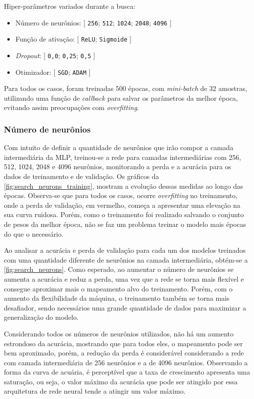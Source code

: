 Hiper-parâmetros variados durante a busca:


\begin{itemize}
	\item Número de neurônios: [ \texttt{256}; \texttt{512}; \texttt{1024}; \texttt{2048}; \texttt{4096} ]
	\item Função de ativação: [ \texttt{ReLU}; \texttt{Sigmoide} ]
	\item \textit{Dropout}: [ \texttt{0,0}; \texttt{0,25}; \texttt{0,5} ]
	\item Otimizador: [ \texttt{SGD}; \texttt{ADAM} ]
\end{itemize} 

Para todos os casos, foram treinadas 500 épocas, com \textit{mini-batch} de 32 amostras, utilizando uma função de \textit{callback} para salvar os parâmetros da melhor época, evitando assim preocupações com \textit{overfitting}.

\subsubsection{Número de neurônios}

Com intuito de definir a quantidade de neurônios que irão compor a camada intermediária da MLP, treinou-se a rede para camadas intermediárias com 256, 512, 1024, 2048 e 4096 neurônios, monitorando a perda e a acurácia para os dados de treinamento e de validação. Os gráficos da \autoref{fig:search_neurons_training}, mostram a evolução dessas medidas ao longo das épocas. Observa-se que para todos os casos, ocorre \textit{overfitting} no treinamento, onde a perda de validação, em vermelho, começa a apresentar uma elevação na sua curva ruidosa. Porém, como o treinamento foi realizado salvando o conjunto de pesos da melhor época, não se faz um problema treinar o modelo mais épocas do que o necessário.



Ao analisar a acurácia e perda de validação para cada um dos modelos treinados com uma quantidade diferente de neurônios na camada intermediária, obtém-se a \autoref{fig:search_neurons}. Como esperado, ao aumentar o número de neurônios se aumenta a acurácia e reduz a perda, uma vez que a rede se torna mais flexível e consegue aproximar mais o mapeamento alvo do treinamento. Porém, com o aumento da flexibilidade da máquina, o treinamento também se torna mais desafiador, sendo necessários uma grande quantidade de dados para maximizar a generalização do modelo.

Considerando todos os números de neurônios utilizados, não há um aumento estrondoso da acurácia, mostrando que para todos eles, o mapeamento pode ser bem aproximado, porém, a redução da perda é considerável considerando a rede com camada intermediária de 256 neurônios e a de 4096 neurônios. Observando a forma da curva de acuária, é perceptível que a taxa de crescimento apresenta uma saturação, ou seja, o valor máximo da acurácia que pode ser atingido por essa arquitetura de rede neural tende a atingir um valor máximo.

